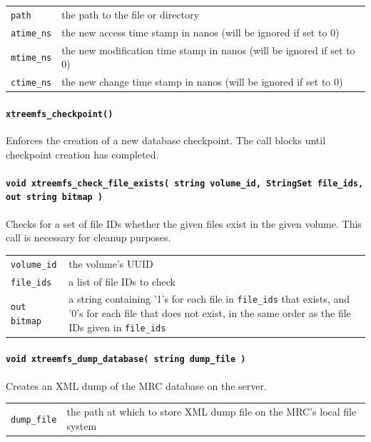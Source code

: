 \begin{tabularx}{\textwidth}{lX}
 \texttt{path} & the path to the file or directory\\
 \texttt{atime\_ns} & the new access time stamp in nanos (will be ignored if set to 0)\\
 \texttt{mtime\_ns} & the new modification time stamp in nanos (will be ignored if set to 0)\\
 \texttt{ctime\_ns} & the new change time stamp in nanos (will be ignored if set to 0)\\
\end{tabularx}

\paragraph{\texttt{xtreemfs\_checkpoint()}}
Enforces the creation of a new database checkpoint. The call blocks until checkpoint creation has completed.

\paragraph{\texttt{void xtreemfs\_check\_file\_exists( string volume\_id, StringSet file\_ids, out string bitmap )}}
Checks for a set of file IDs whether the given files exist in the given volume. This call is necessary for cleanup purposes.

\begin{tabularx}{\textwidth}{lX}
 \texttt{volume\_id} & the volume's UUID\\
 \texttt{file\_ids} & a list of file IDs to check\\
 \texttt{out bitmap} & a string containing '1's for each file in \texttt{file\_ids} that exists, and '0's for each file that does not exist, in the same order as the file IDs given in \texttt{file\_ids}\\
\end{tabularx}

\paragraph{\texttt{void xtreemfs\_dump\_database( string dump\_file )}}
Creates an XML dump of the MRC database on the server.

\begin{tabularx}{\textwidth}{lX}
 \texttt{dump\_file} & the path at which to store XML dump file on the MRC's\index{MRC} local file system\\
\end{tabularx}

